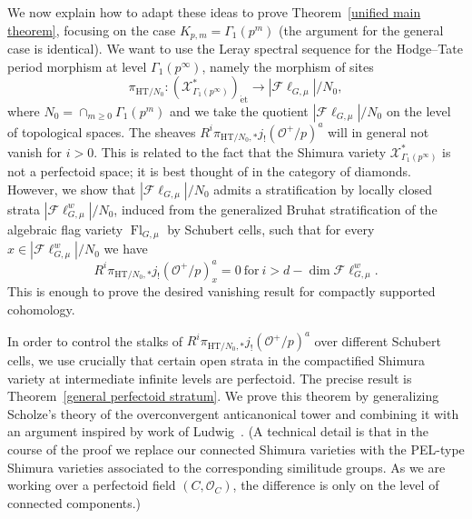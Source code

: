 \documentclass{amsart}
\theoremstyle{remark}
\numberwithin{equation}{subsection}
\newcommand{\cO}{{\mathcal O}}
\newcommand{\cX}{{\mathcal X}}
\DeclareMathOperator{\Flr}{Fl}
\newcommand{\HT}{\mathrm{HT}}
\newcommand{\et}{\mathrm{\acute{e}t}}
\newcommand{\Fl}{\mathscr{F}\!\ell}
\renewcommand{\(}{\left(}
\renewcommand{\)}{\right)}
\begin{document}
We now explain how to adapt these ideas to prove Theorem~\ref{unified main theorem}, focusing on the case $K_{p,m}=\Gamma_1(p^m)$ (the argument for the general case is identical). We want to use the Leray spectral sequence for the Hodge--Tate period morphism at level $\Gamma_1(p^\infty)$, namely the morphism of sites
\[
\pi_{\HT/N_0}\colon (\cX^*_{\Gamma_1(p^\infty)})_{\et}\to |\Fl_{G,\mu}|/N_0,
\]
where $N_0=\cap_{m\geq 0}\Gamma_1(p^m)$ and we take the quotient $|\Fl_{G,\mu}|/N_0$ on the level of topological spaces. The sheaves $R^i\pi_{\HT/N_0,*}j_{!}(\cO^+/p)^a$ will in general not vanish for $i>0$. This is related to the fact that the Shimura variety $\cX^*_{\Gamma_1(p^\infty)}$ is not a perfectoid space; it is best thought of in the category of diamonds. However, we show that $|\Fl_{G,\mu}|/N_0$ admits a stratification by locally closed strata $|\Fl^w_{G,\mu}|/N_0$, induced from the generalized Bruhat stratification of the algebraic flag variety $\Flr_{G,\mu}$ by Schubert cells, such that for every $x\in |\Fl^w_{G,\mu}|/N_0$ we have
\[
R^i\pi_{\HT/N_0,*}j_{!}(\cO^+/p)^a_x=0\ \mathrm{for}\ i>d-\dim \Fl^w_{G,\mu}.
\]
This is enough to prove the desired vanishing result for compactly supported cohomology. 

In order to control the stalks of $R^i\pi_{\HT/N_0,*}j_{!}(\cO^+/p)^a$ over different Schubert cells, we use crucially that certain open strata in the compactified Shimura variety at intermediate infinite levels are perfectoid. The precise result is Theorem~\ref{general perfectoid stratum}. We prove this theorem by generalizing Scholze's theory of the overconvergent anticanonical tower and combining it with an argument inspired by work of Ludwig~\cite{ludwig}. (A technical detail is that in the course of the proof we replace our connected Shimura varieties with the PEL-type Shimura varieties associated to the corresponding similitude groups. As we are working over a perfectoid field $(C,\cO_C)$, the difference is only on the level of connected components.)  
\end{document}
